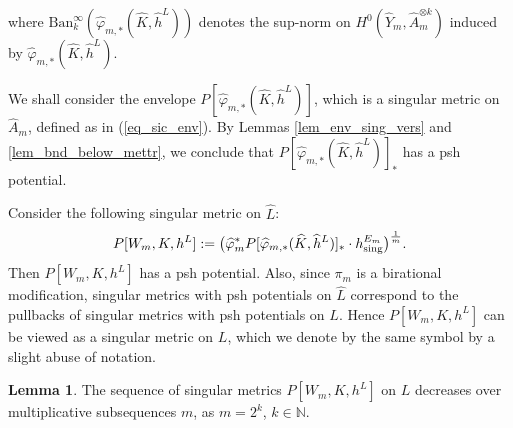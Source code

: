 \documentclass[12pt]{article}
\numberwithin{equation}{section}
\theoremstyle{theorem}
\theoremstyle{definition}
\newtheorem{lem}[thm]{Lemma}
\theoremstyle{remark}
\newcommand{\nat}{\mathbb{N}}
\begin{document}
	where $\textrm{Ban}_{k}^{\infty}(\widehat{\varphi}_{m, *} (\widehat{K}, \widehat{h}^L))$ denotes the sup-norm on $H^0(\widehat{Y}_m, \widehat{A}_m^{\otimes k})$ induced by $\widehat{\varphi}_{m, *} (\widehat{K}, \widehat{h}^L)$.
	\par 
	We shall consider the envelope $P[\widehat{\varphi}_{m, *} (\widehat{K}, \widehat{h}^L)]$, which is a singular metric on $\widehat{A}_m$, defined as in (\ref{eq_sic_env}).
	By Lemmas \ref{lem_env_sing_vers} and \ref{lem_bnd_below_mettr}, we conclude that $P[\widehat{\varphi}_{m, *} (\widehat{K}, \widehat{h}^L)]_*$ has a psh potential.
	\par 
	Consider the following singular metric on $\hat{L}$:
	\begin{equation}\label{eq_hlm_defn}
		P[W_m, K, h^L] := \big( \widehat{\varphi}_m^* P[\widehat{\varphi}_{m, *} (\widehat{K}, \widehat{h}^L)]_* \cdot h^{E_m}_{\rm{sing}}\big)^{\frac{1}{m}}.
	\end{equation}
	Then $P[W_m, K, h^L]$ has a psh potential.
	Also, since $\pi_m$ is a birational modification, singular metrics with psh potentials on $\widehat{L}$ correspond to the pullbacks of singular metrics with psh potentials on $L$. 
	Hence $P[W_m, K, h^L]$ can be viewed as a singular metric on $L$, which we denote by the same symbol by a slight abuse of notation.
	\begin{lem}\label{lem_decr_quant_sch}
		The sequence of singular metrics $P[W_m, K, h^L]$ on $L$ decreases over multiplicative subsequences $m$, as $m = 2^k$, $k \in \nat$.
	\end{lem}
\end{document}
